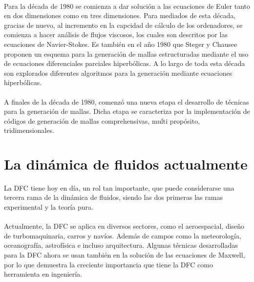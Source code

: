 \documentclass[letterpaper, openright, 12pt]{book}
\begin{document}
    \paragraph*{}
    Para la década de 1980 se comienza a dar solución a las ecuaciones de Euler
    tanto en dos dimensiones como en tres dimensiones. Para mediados de esta
    década, gracias de nuevo, al incremento en la capcidad de cálculo de los
    ordenadores, se comienza a hacer análisis de flujos viscosos, los cuales
    son descritos por las ecuaciones de Navier-Stokes.\cite{blazek} Es también
    en el año 1980 que Steger y Chausee proponen un esquema para la generación
    de mallas estructuradas mediante el uso de ecuaciones diferenciales
    parciales hiperbólicas. A lo largo de toda esta década son explorados
    diferentes algoritmos para la generación mediante ecuaciones hiperbólicas.

    \paragraph*{}
    A finales de la década de 1980, comenzó una nueva etapa el desarrollo de
    técnicas para la generación de mallas. Dicha etapa se caracteriza por la
    implementación de códigos de generación de mallas comprehensivas, multi
    propósito, tridimensionales.\cite{liseikin1999grid}

    \section{La dinámica de fluidos actualmente}
    \paragraph*{}
    La DFC tiene hoy en día, un rol tan importante, que puede considerarse una
    tercera rama de la dinámica de fluidos, siendo las dos primeras las ramas
    experimental y la teoría pura.\cite{anderson-yotros}

    \paragraph*{}
    Actualmente, la DFC se aplica en diversos sectores, como el aeroespacial,
    diseño de turbomaquinaria, carros y navíos. Además de campos como la
    meteorología, oceanografía, astrofísica e incluso arquitectura. Algunas
    técnicas desarrolladas para la DFC ahora se usan también en la solución de
    las ecuaciones de Maxwell, por lo que demuestra la creciente importancia
    que tiene la DFC como herramienta en ingeniería.\cite{blazek}
\end{document}
